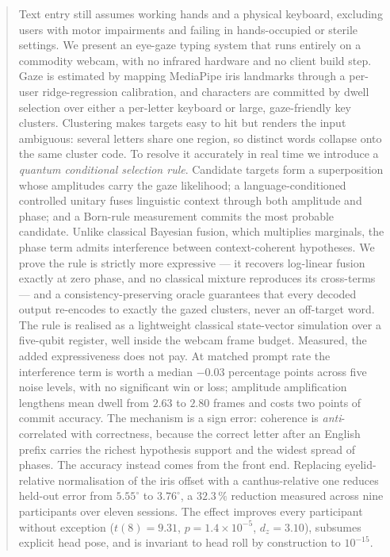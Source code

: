 \documentclass[conference]{IEEEtran}
\begin{document}
\maketitle

\begin{abstract}
Text entry still assumes working hands and a physical keyboard, excluding users
with motor impairments and failing in hands-occupied or sterile settings. We
present an eye-gaze typing system that runs entirely on a commodity webcam, with
no infrared hardware and no client build step. Gaze is estimated by mapping
MediaPipe iris landmarks through a per-user ridge-regression calibration, and
characters are committed by dwell selection over either a per-letter keyboard or
large, gaze-friendly key clusters. Clustering makes targets easy to hit but
renders the input ambiguous: several letters share one region, so distinct words
collapse onto the same cluster code. To resolve it accurately in real
time we introduce a \emph{quantum conditional selection rule}. Candidate
targets form a superposition whose amplitudes carry the gaze likelihood; a
language-conditioned controlled unitary fuses linguistic context through both
amplitude and phase; and a Born-rule measurement commits the most probable
candidate. Unlike classical Bayesian fusion, which multiplies marginals, the
phase term admits interference between context-coherent hypotheses. We prove the
rule is strictly more expressive --- it recovers log-linear fusion exactly at
zero phase, and no classical mixture reproduces its cross-terms --- and a
consistency-preserving oracle guarantees that every decoded output re-encodes to
exactly the gazed clusters, never an off-target word. The rule is realised as a
lightweight classical state-vector simulation over a five-qubit register, well
inside the webcam frame budget.
Measured, the added expressiveness does not pay. At
matched prompt rate the interference term is worth a median $-0.03$ percentage
points across five noise levels, with no significant win or loss; amplitude
amplification lengthens mean dwell from $2.63$ to $2.80$ frames and costs two
points of commit accuracy. The mechanism is a sign error:
coherence is \emph{anti}-correlated with correctness, because the correct letter
after an English prefix carries the richest hypothesis support and the widest
spread of phases. The accuracy instead comes from the front end.
Replacing eyelid-relative normalisation of the iris offset with a
canthus-relative one reduces held-out error from $5.55^\circ$ to $3.76^\circ$, a
$32.3\,\%$ reduction measured across nine participants over eleven sessions. The
effect improves every participant without exception ($t(8)=9.31$,
$p=1.4\times10^{-5}$, $d_z=3.10$), subsumes explicit head pose, and is invariant
to head roll by construction to $10^{-15}$.
\end{abstract}
\end{document}
